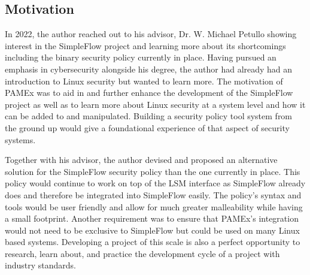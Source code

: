 \subsection{Motivation}
\par 
\vspace{\baselineskip}
\hspace{1em}
In 2022, the author reached out to his advisor, Dr. W. Michael 
Petullo showing interest in the SimpleFlow project and learning more about 
its shortcomings including the binary security policy currently in 
place. Having pursued an emphasis in cybersecurity alongside his 
degree, the author had already had an introduction to Linux security 
but wanted to learn more. The motivation of PAMEx was to aid in and 
further enhance the development of the SimpleFlow project as well as 
to learn more about Linux security at a system level and how it can 
be added to and manipulated. Building a security policy tool system 
from the ground up would give a foundational experience of 
that aspect of security systems. 

Together with his advisor, the author devised and proposed an 
alternative solution for the SimpleFlow security policy than the 
one currently in place. This policy would continue to work on top 
of the LSM interface as SimpleFlow already does and therefore be 
integrated into SimpleFlow easily. The policy’s syntax and 
tools would be user friendly and allow for much greater malleability 
while having a small footprint. Another requirement was to ensure 
that PAMEx's integration would not need to be exclusive 
to SimpleFlow but could be used on many Linux based systems. Developing 
a project of this scale is also a perfect opportunity to research, learn about, and practice the development cycle of 
a project with industry standards.  

